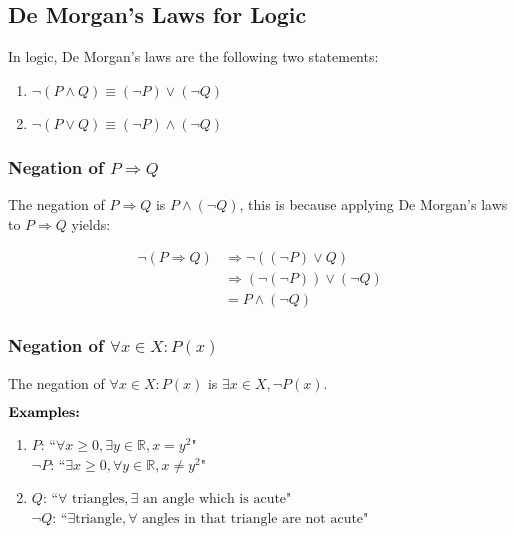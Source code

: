 \documentclass{article}
\begin{document}
\subsection{De Morgan's Laws for Logic}

In logic, De Morgan's laws are the following two statements:

\begin{enumerate}
    \item $\lnot (P \land Q) \equiv (\lnot P) \lor (\lnot Q)$
    \item $\lnot (P \lor Q) \equiv (\lnot P) \land (\lnot Q)$
\end{enumerate}

\subsubsection{Negation of $P \Rightarrow Q$}

The negation of $P \Rightarrow Q$ is $P \land (\lnot Q)$, this is because applying De Morgan's laws to $P \Rightarrow Q$ yields:

\begin{align*}
    \lnot (P \Rightarrow Q) &\Rightarrow \lnot ((\lnot P) \lor Q) \\
    &\Rightarrow (\lnot (\lnot P)) \lor (\lnot Q) \\
    &= P \land (\lnot Q)
\end{align*}

\subsubsection{Negation of $\forall x \in X \colon P(x)$}

The negation of $\forall x \in X \colon P(x)$ is $\exists x \in X, \lnot P(x)$.

$\hfill \break \textbf{Examples:}$

\begin{enumerate}
    \item $P$: ``$\forall x \ge 0, \exists y \in \mathbb{R}, x = y^2$" \\
    $\lnot P$: ``$\exists x \ge 0, \forall y \in \mathbb{R}, x \not = y^2$"

    \item $Q$: ``$\forall \text{ triangles}, \exists \text{ an angle which is acute}$" \\
    $\lnot Q$: ``$\exists \text {triangle}, \forall \text{ angles in that triangle are not acute}$"
\end{enumerate}
\end{document}
